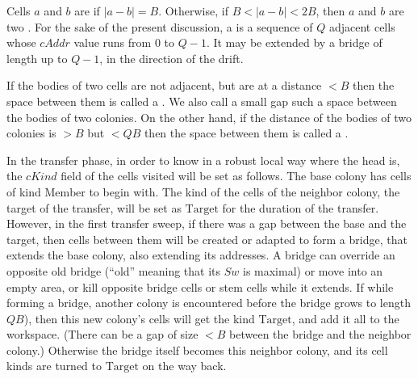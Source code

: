 \documentclass[12pt]{memoir}
\newcommand{\fld}[1]{\ensuremath{\textit{#1}}}
\newcommand{\rul}[1]{\ensuremath{\texttt{\slshape #1\/}}}
\def\B{B}
\newcommand{\cAddr}{\fld{cAddr}}
\newcommand{\cDrift}{\fld{cDrift}}
\newcommand{\cKind}{\fld{cKind}}
\newcommand{\Sweep}{\fld{Sw}}
\newcommand{\cSweep}{\fld{cSw}}
\newcommand{\Last}{\mathrm{Last}}
\newcommand{\Member}{\mathrm{Member}}
\newcommand{\Target}{\mathrm{Target}}
\newcommand{\Alarm}{\rul{Alarm}}
\begin{document}
\begin{definition}\label{def:adjacent}
  Cells \( a \) and \( b \) are  if \( |a-b|=\B \).
  Otherwise, if \( \B < | a- b| < 2\B \), then
  \( a \) and \( b \) are two .
For the sake of the present discussion, a  is a sequence of \( Q \) adjacent
cells whose \( \cAddr \) value runs from \( 0 \) to \( Q-1 \).
It may be extended by a bridge of length up to \( Q-1 \), in the direction of the drift.

If the bodies of two cells are not adjacent, but are at a distance \( <\B \) then the space
between them is called a .
We also call a small gap such a space between the bodies of two colonies.
On the other hand, if the distance of the bodies of two colonies is \( >\B \) 
but \( <Q\B \) then the space between them is called a .
\end{definition}

In the transfer phase, in order to know in a robust local way where the head is,
the \( \cKind \) field of the cells visited will be set as follows.
The base colony has cells of kind \( \Member \) to begin with.
The kind of the cells of the neighbor colony, the target of the transfer, will be set
as \( \Target \) for the duration of the transfer.
However, in the first transfer sweep, if there was a gap between the base and
the target, then cells between them will be created or adapted to form
a bridge, that extends the base colony, also extending its addresses.
A bridge can override an opposite old bridge (``old'' meaning 
that its \( \Sweep \) is maximal) or move 
into an empty area, or kill opposite bridge cells or stem cells while it extends.
If while forming a bridge, another colony is encountered before
the bridge grows to length \( Q\B \)), then this new colony's cells will get the 
kind \( \Target \), and add it all to the workspace.
(There can be a gap of size \( <\B \) between the bridge and the neighbor colony.)
Otherwise the bridge itself becomes this neighbor colony, and its cell kinds are
turned to \( \Target \) on the way back.


\end{document}
